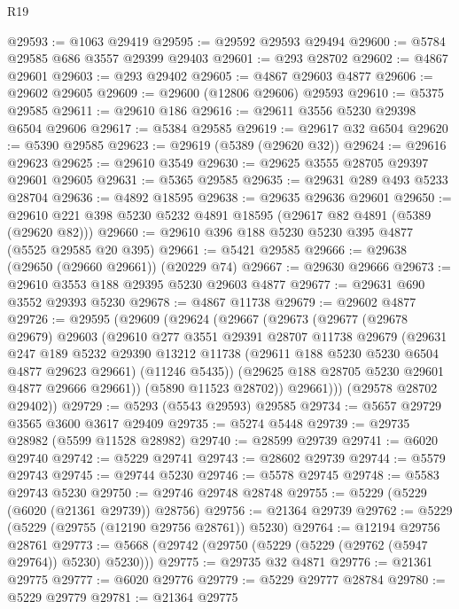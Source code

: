 \begin{lexlean}{R19}
\begin{coremodule}
@29593 := @1063 @29419
@29595 := @29592 @29593 @29494
@29600 := @5784 @29585 @686 @3557 @29399 @29403
@29601 := @293 @28702
@29602 := @4867 @29601
@29603 := @293 @29402
@29605 := @4867 @29603 @4877
@29606 := @29602 @29605
@29609 := @29600 (@12806 @29606) @29593
@29610 := @5375 @29585
@29611 := @29610 @186
@29616 := @29611 @3556 @5230 @29398 @6504 @29606
@29617 := @5384 @29585
@29619 := @29617 @32 @6504
@29620 := @5390 @29585
@29623 := @29619 (@5389 (@29620 @32))
@29624 := @29616 @29623
@29625 := @29610 @3549
@29630 := @29625 @3555 @28705 @29397 @29601 @29605
@29631 := @5365 @29585
@29635 := @29631 @289 @493 @5233 @28704
@29636 := @4892 @18595
@29638 := @29635 @29636 @29601
@29650 := @29610 @221 @398 @5230 @5232 @4891 @18595 (@29617 @82 @4891 (@5389 (@29620 @82)))
@29660 := @29610 @396 @188 @5230 @5230 @395 @4877 (@5525 @29585 @20 @395)
@29661 := @5421 @29585
@29666 := @29638 (@29650 (@29660 @29661)) (@20229 @74)
@29667 := @29630 @29666
@29673 := @29610 @3553 @188 @29395 @5230 @29603 @4877
@29677 := @29631 @690 @3552 @29393 @5230
@29678 := @4867 @11738
@29679 := @29602 @4877
@29726 := @29595
    (@29609
      (@29624
        (@29667
          (@29673
            (@29677
              (@29678 @29679)
              @29603
              (@29610
                @277
                @3551
                @29391
                @28707
                @11738
                @29679
                (@29631
                  @247
                  @189
                  @5232
                  @29390
                  @13212
                  @11738
                  (@29611 @188 @5230 @5230 @6504 @4877 @29623 @29661)
                  (@11246 @5435))
                (@29625 @188 @28705 @5230 @29601 @4877 @29666 @29661))
              (@5890 @11523 @28702))
            @29661)))
      (@29578 @28702 @29402))
@29729 := @5293 (@5543 @29593) @29585
@29734 := @5657 @29729 @3565 @3600 @3617 @29409
@29735 := @5274 @5448
@29739 := @29735 @28982 (@5599 @11528 @28982)
@29740 := @28599 @29739
@29741 := @6020 @29740
@29742 := @5229 @29741
@29743 := @28602 @29739
@29744 := @5579 @29743
@29745 := @29744 @5230
@29746 := @5578 @29745
@29748 := @5583 @29743 @5230
@29750 := @29746 @29748 @28748
@29755 := @5229 (@5229 (@6020 (@21361 @29739)) @28756)
@29756 := @21364 @29739
@29762 := @5229 (@5229 (@29755 (@12190 @29756 @28761)) @5230)
@29764 := @12194 @29756 @28761
@29773 := @5668 (@29742 (@29750 (@5229 (@5229 (@29762 (@5947 @29764)) @5230) @5230)))
@29775 := @29735 @32 @4871
@29776 := @21361 @29775
@29777 := @6020 @29776
@29779 := @5229 @29777 @28784
@29780 := @5229 @29779
@29781 := @21364 @29775

\end{coremodule}
\end{lexlean}
